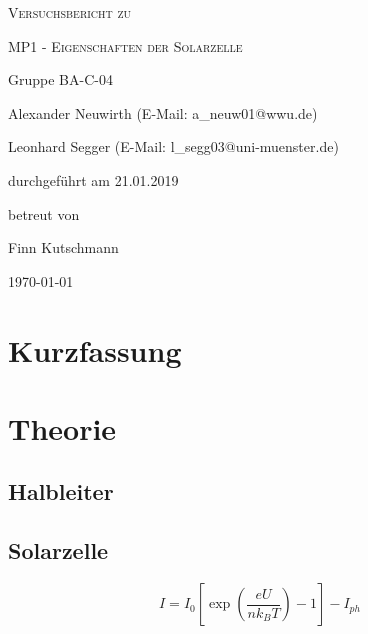 \documentclass[
	a4paper,
	12pt,
	pagesize,
	ngerman
]{scrartcl}
\begin{document}
	\begin{titlepage}
		\centering
		{\scshape\LARGE Versuchsbericht zu \par}
		\vspace{1cm}
		{\scshape\huge MP1 - Eigenschaften der Solarzelle \par} %
		\vspace{2.5cm}
		{\LARGE Gruppe BA-C-04 \par}
		\vspace{0.5cm}

		{\large Alexander Neuwirth (E-Mail: a\_neuw01@wwu.de) \par}
		{\large Leonhard Segger (E-Mail: l\_segg03@uni-muenster.de) \par}
		\vfill

		durchgeführt am 21.01.2019\par
		betreut von\par
		{\large Finn Kutschmann}

		\vfill

		{\large \today\par}
	\end{titlepage}
	\tableofcontents
	\newpage


	\section{Kurzfassung}



  \section{Theorie}



	\subsection{Halbleiter}

	\subsection{Solarzelle}
	\begin{equation}
			\label{eq_photostrom}
			I = I_0 \left[\exp{\left(\frac{eU}{n k_B T}\right)}-1\right]-I_{ph}
	\end{equation}
\end{document}
